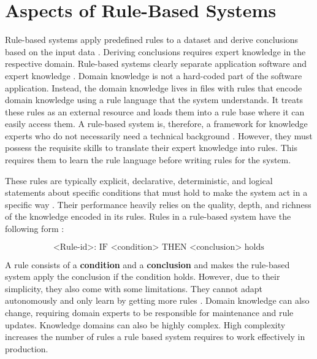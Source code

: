 \chapter{Aspects of Rule-Based Systems}\label{ch:aspects-of-rule-based-systems}
Rule-based systems apply predefined rules to a dataset and derive conclusions based on the input data \cite{grosan2011rule}.
Deriving conclusions requires expert knowledge in the respective domain.
Rule-based systems clearly separate application software and expert knowledge \cite{abdullah2017performance}.
Domain knowledge is not a hard-coded part of the software application.
Instead, the domain knowledge lives in files with rules that encode domain knowledge using a rule language that the system understands.
It treats these rules as an external resource and loads them into a rule base where it can easily access them.
A rule-based system is, therefore, a framework for knowledge experts who do not necessarily need a technical background \cite{masri2019survey}.
However, they must possess the requisite skills to translate their expert knowledge into rules.
This requires them to learn the rule language before writing rules for the system.

These rules are typically explicit,
declarative, deterministic, and logical statements about specific conditions that must hold to make the system act in a specific way \cite{hayes1985rule}.
Their performance heavily relies on the quality, depth, and richness of the knowledge encoded in its rules.
Rules in a rule-based system have the following form \cite{hayes1985rule}:

\[
    \text{<Rule-id>}: \text{ IF } \text{<condition>} \text{ THEN } \text{<conclusion>} \text{ holds}
\]

A rule consists of a \textbf{condition} and a \textbf{conclusion}
and makes the rule-based system apply the conclusion if the condition holds.
However, due to their simplicity, they also come with some limitations.
They cannot adapt autonomously and only learn by getting more rules \cite{oberste2022supporting}.
Domain knowledge can also change, requiring domain experts to be responsible for maintenance and rule updates.
Knowledge domains can also be highly complex.
High complexity increases the number of rules a rule based system requires to work effectively in production.

